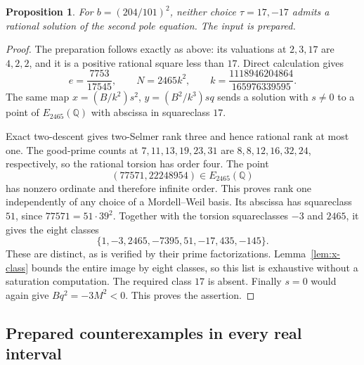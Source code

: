 \documentclass[11pt,a4paper]{article}
\newtheorem{proposition}[theorem]{Proposition}
\theoremstyle{definition}\newtheorem{definition}[theorem]{Definition}
\newcommand{\Q}{\mathbb Q}\newcommand{\Z}{\mathbb Z}
\begin{document}
\begin{proposition}\label{prop:tau17}
For $b=(204/101)^2$, neither choice $\tau=17,-17$ admits a
rational solution of the second pole equation. The input is prepared.
\end{proposition}
\begin{proof}
The preparation follows exactly as above: its valuations at
$2,3,17$ are $4,2,2$, and it is a positive rational square less
than $17$. Direct calculation gives
\[
 e=\frac{7753}{17545},\qquad
 N=2465k^2,\qquad
 k=\frac{1118946204864}{165976339595}.
\]
The same map
$x=(B/k^2)s^2$, $y=(B^2/k^3)sq$ sends a solution with
$s\ne0$ to a point of $E_{2465}(\Q)$ with abscissa in
squareclass $17$.

Exact two-descent gives two-Selmer rank three and hence rational
rank at most one. The good-prime counts at $7,11,13,19,23,31$
are $8,8,12,16,32,24$, respectively, so the rational torsion has
order four. The point
\[
                  (77571,22248954)\in E_{2465}(\Q)
\]
has nonzero ordinate and therefore infinite order. This proves
rank one independently of any choice of a Mordell--Weil basis.
Its abscissa has squareclass $51$, since $77571=51\cdot39^2$.
Together with the torsion squareclasses $-3$ and $2465$, it gives
the eight classes
\[
 \{1,-3,2465,-7395,51,-17,435,-145\}.
\]
These are distinct, as is verified by their prime factorizations.
Lemma~\ref{lem:x-class} bounds the entire image by eight classes,
so this list is exhaustive without a saturation computation.
The required class $17$ is absent. Finally $s=0$ would again
give $Bq^2=-3M^2<0$. This proves the assertion.
\end{proof}

\subsection{Prepared counterexamples in every real interval}
\end{document}
